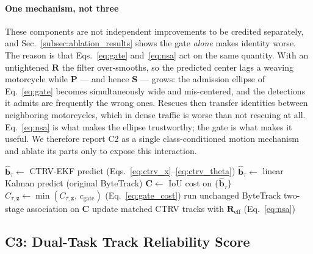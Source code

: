 \paragraph{One mechanism, not three}
These components are not independent improvements to be credited
separately, and Sec.~\ref{subsec:ablation_results} shows the gate
\emph{alone} makes identity worse.
The reason is that Eqs.~\eqref{eq:gate} and~\eqref{eq:nsa} act on the
same quantity.
With an untightened $\mathbf{R}$ the filter over-smooths, so the
predicted center lags a weaving motorcycle while $\mathbf{P}$ --- and
hence $\mathbf{S}$ --- grows: the admission ellipse of
Eq.~\eqref{eq:gate} becomes simultaneously wide and mis-centered, and
the detections it admits are frequently the wrong ones.
Rescues then transfer identities between neighboring motorcycles, which
in dense traffic is worse than not rescuing at all.
Eq.~\eqref{eq:nsa} is what makes the ellipse trustworthy; the gate is
what makes it useful.
We therefore report C2 as a single class-conditioned motion mechanism
and ablate its parts only to expose this interaction.

\begin{algorithm}[t]
  \caption{Class-conditioned prediction and association}
  \label{alg:motion_model}
  \begin{algorithmic}[1]
        \State $\hat{\mathbf{b}}_\tau \gets$ CTRV-EKF predict
               (Eqs.~\ref{eq:ctrv_x}--\ref{eq:ctrv_theta})
      \Else
        \State $\hat{\mathbf{b}}_\tau \gets$ linear Kalman predict
               (original ByteTrack)
      \EndIf
    \EndFor
    \State $\mathbf{C} \gets$ IoU cost on $\{\hat{\mathbf{b}}_\tau\}$
        \State $C_{\tau,\mathbf{z}} \gets
               \min(C_{\tau,\mathbf{z}},\, c_{\mathrm{gate}})$
               (Eq.~\ref{eq:gate_cost})
      \EndIf
    \EndFor
    \State run unchanged ByteTrack two-stage association on $\mathbf{C}$
    \State update matched CTRV tracks with $\mathbf{R}_{\mathrm{eff}}$
           (Eq.~\ref{eq:nsa})
  \end{algorithmic}
\end{algorithm}

\subsection{C3: Dual-Task Track Reliability Score}
\label{subsec:c3}

